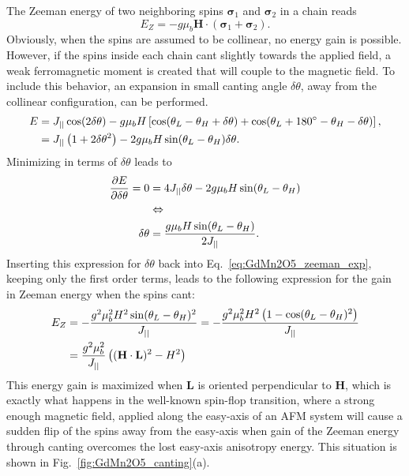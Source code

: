 The Zeeman energy of two neighboring spins $\pmb{\sigma}_1$ and $\pmb{\sigma}_2$ in a chain reads
\begin{equation}
	E_Z = -g \mu_b \mathbf{H} \cdot (\pmb{\sigma}_1 + \pmb{\sigma}_2).
\end{equation}
Obviously, when the spins are assumed to be collinear, no energy gain is possible. However, if the spins inside each chain cant slightly towards the applied field, a weak ferromagnetic moment is created that will couple to the magnetic field. To include this behavior, an expansion in small canting angle $\delta \theta$, away from the collinear configuration, can be performed.
\begin{align}
	E &= J_{||} \cos(2\delta \theta) - g \mu_b H \left[\cos(\theta_L - \theta_H + \delta \theta) + \cos(\theta_L + 180^\circ - \theta_H - \delta \theta)\right],\nonumber\\
	&= J_{||} \left( 1+2\delta\theta^2 \right) - 2 g \mu_b H \sin(\theta_L - \theta_H)\delta\theta \label{eq:GdMn2O5_zeeman_exp}.
\end{align}
Minimizing in terms of $\delta \theta$ leads to
\begin{align}
	\frac{\partial E}{\partial \delta \theta} = 0 &= 4 J_{||} \delta \theta - 2 g \mu_b H \sin(\theta_L - \theta_H) \nonumber\\
	&\Leftrightarrow \nonumber\\
	\delta \theta &= \frac{g\mu_b H \sin(\theta_L - \theta_H)}{2 J_{||}}.\nonumber
\end{align}
Inserting this expression for $\delta \theta$ back into Eq.~\ref{eq:GdMn2O5_zeeman_exp}, keeping only the first order terms, leads to the following expression for the gain in Zeeman energy when the spins cant:
\begin{align}
	E_Z &= -\frac{g^2\mu_b^2 H^2 \sin(\theta_L - \theta_H)^2}{J_{||}} = -\frac{g^2\mu_b^2 H^2 \left(1 - \cos(\theta_L - \theta_H)^2\right)}{J_{||}} \nonumber\\
	&=\frac{g^2\mu_b^2}{J_{||}}\left((\mathbf{H}\cdot\mathbf{L})^2 - H^2\right)\nonumber
\end{align}
This energy gain is maximized when $\mathbf{L}$ is oriented perpendicular to $\mathbf{H}$, which is exactly what happens in the well-known spin-flop transition, where a strong enough magnetic field, applied along the easy-axis of an AFM system will cause a sudden flip of the spins away from the easy-axis when gain of the Zeeman energy through canting overcomes the lost easy-axis anisotropy energy. This situation is shown in Fig.~\ref{fig:GdMn2O5_canting}(a).

